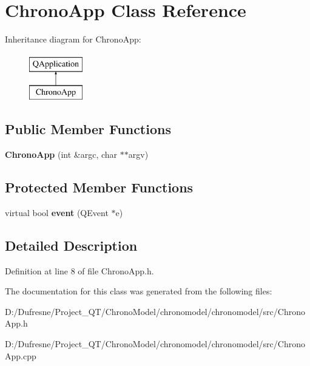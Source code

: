 \hypertarget{class_chrono_app}{\section{Chrono\-App Class Reference}
\label{class_chrono_app}
}
Inheritance diagram for Chrono\-App\-:\begin{figure}[H]
\begin{center}
\leavevmode
\includegraphics[height=2.000000cm]{class_chrono_app}
\end{center}
\end{figure}
\subsection*{Public Member Functions}
\begin{DoxyCompactItemize}
\item 
\hypertarget{class_chrono_app_ae7814a9a6fb02718be9d332836902e7c}{{\bfseries Chrono\-App} (int \&argc, char $\ast$$\ast$argv)}\label{class_chrono_app_ae7814a9a6fb02718be9d332836902e7c}

\end{DoxyCompactItemize}
\subsection*{Protected Member Functions}
\begin{DoxyCompactItemize}
\item 
\hypertarget{class_chrono_app_a027f7f84ba604261c0154e3f689de275}{virtual bool {\bfseries event} (Q\-Event $\ast$e)}\label{class_chrono_app_a027f7f84ba604261c0154e3f689de275}

\end{DoxyCompactItemize}


\subsection{Detailed Description}


Definition at line 8 of file Chrono\-App.\-h.



The documentation for this class was generated from the following files\-:\begin{DoxyCompactItemize}
\item 
D\-:/\-Dufresne/\-Project\-\_\-\-Q\-T/\-Chrono\-Model/chronomodel/chronomodel/src/Chrono\-App.\-h\item 
D\-:/\-Dufresne/\-Project\-\_\-\-Q\-T/\-Chrono\-Model/chronomodel/chronomodel/src/Chrono\-App.\-cpp\end{DoxyCompactItemize}
